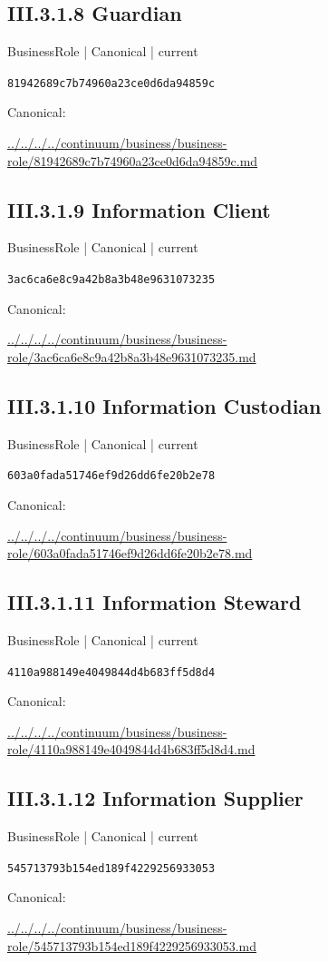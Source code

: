 \documentclass[10pt,a4paper]{article}
\begin{document}
\subsection*{III.3.1.8 Guardian}
{\small BusinessRole | Canonical | current}\par
\texttt{81942689c7b74960a23ce0d6da94859c}\par
Canonical: \par
{\footnotesize\url{../../../../continuum/business/business-role/81942689c7b74960a23ce0d6da94859c.md}}\par
\subsection*{III.3.1.9 Information Client}
{\small BusinessRole | Canonical | current}\par
\texttt{3ac6ca6e8c9a42b8a3b48e9631073235}\par
Canonical: \par
{\footnotesize\url{../../../../continuum/business/business-role/3ac6ca6e8c9a42b8a3b48e9631073235.md}}\par
\subsection*{III.3.1.10 Information Custodian}
{\small BusinessRole | Canonical | current}\par
\texttt{603a0fada51746ef9d26dd6fe20b2e78}\par
Canonical: \par
{\footnotesize\url{../../../../continuum/business/business-role/603a0fada51746ef9d26dd6fe20b2e78.md}}\par
\subsection*{III.3.1.11 Information Steward}
{\small BusinessRole | Canonical | current}\par
\texttt{4110a988149e4049844d4b683ff5d8d4}\par
Canonical: \par
{\footnotesize\url{../../../../continuum/business/business-role/4110a988149e4049844d4b683ff5d8d4.md}}\par
\subsection*{III.3.1.12 Information Supplier}
{\small BusinessRole | Canonical | current}\par
\texttt{545713793b154ed189f4229256933053}\par
Canonical: \par
{\footnotesize\url{../../../../continuum/business/business-role/545713793b154ed189f4229256933053.md}}\par
\end{document}
